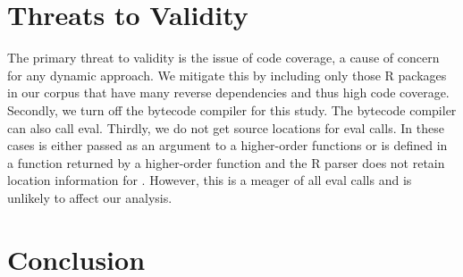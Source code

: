 \documentclass[conference]{IEEEtran}
\begin{document}
\section{Threats to Validity} The primary threat to validity is the issue of
code coverage, a cause of concern for any dynamic approach. We mitigate this by
including only those R packages in our corpus that have many reverse
dependencies and thus high code coverage. Secondly, we turn off the bytecode
compiler for this study. The bytecode compiler can also call eval. Thirdly, we
do not get source locations for \UndefinedEvalsRnd eval calls. In these cases
\eval is either passed as an argument to a higher-order functions or is defined
in a function returned by a higher-order function and the R parser does not
retain location information for \eval. However, this is a meager
\PercentUndefinedEval of all eval calls and is unlikely to affect our analysis.


\section{Conclusion}



\end{document}
